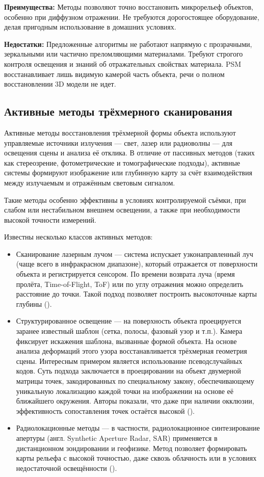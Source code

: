 \textbf{Преимущества:} Методы позволяют точно восстановить микрорельеф объектов,
особенно при диффузном отражении. Не требуются дорогостоящее оборудование,
делая пригодным использование в домашних условиях.

\textbf{Недостатки:} Предложенные алгоритмы не работают напрямую с прозрачными,
зеркальными или частично преломляющими материалами. Требуют строгого контроля
освещения и знаний об отражательных свойствах материала. PSM восстанавливает
лишь видимую камерой часть объекта, речи о полном восстановлении 3D модели не идет.

\subsection{Активные методы трёхмерного сканирования}

Активные методы восстановления трёхмерной формы объекта используют управляемые
источники излучения — свет, лазер или радиоволны — для освещения сцены и анализа
её отклика. В отличие от пассивных методов (таких как стереозрение,
фотометрические и томографические подходы), активные системы формируют
изображение или глубинную карту за счёт взаимодействия между излучаемым и
отражённым световым сигналом.

Такие методы особенно эффективны в условиях контролируемой съёмки, при слабом
или нестабильном внешнем освещении, а также при необходимости высокой точности
измерений.

Известны несколько классов активных методов:

\begin{itemize}
	\item Сканирование лазерным лучом — система испускает узконаправленный луч
	(чаще всего в инфракрасном диапазоне), который отражается от поверхности
	объекта и регистрируется сенсором. По времени возврата луча (время
	пролёта, Time-of-Flight, ToF) или по углу отражения можно определить
	расстояние до точки. Такой подход позволяет построить высокоточные карты
	глубины (\cite{10.1109/CVPR.2010.5540082}).
	\item Структурированное освещение — на поверхность объекта проецируется
	заранее известный шаблон (сетка, полосы, фазовый узор и т.п.). Камера
	фиксирует искажения шаблона, вызванные формой объекта. На основе анализа
	деформаций этого узора восстанавливается трёхмерная геометрия сцены. Интересным
	примером является использование псеводслучайных кодов. Суть подхода
	заключается в проецировании на объект двумерной матрицы точек, закодированных
	по специальному закону, обеспечивающему уникальную локализацию каждой точки на
	изображении на основе её ближайшего окружения. Авторы показали, что даже при наличии
	окклюзии, эффективность сопоставления точек остаётся высокой (\cite{10.1109/34.667888}).
	\item Радиолокационные методы — в частности, радиолокационное синтезирование
	апертуры (англ. Synthetic Aperture Radar, SAR) применяется в дистанционном
	зондировании и геофизике. Метод позволяет формировать карты рельефа с высокой
	точностью, даже сквозь облачность или в условиях недостаточной освещённости
	(\cite{Antipov1988}).
\end{itemize}

